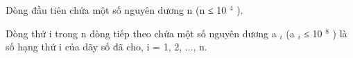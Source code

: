 Dòng đầu tiên chứa một số nguyên dương n (n ≤ 10 $^ 4 $ ).

Dòng thứ i trong n dòng tiếp theo chứa một số nguyên dương a $_ i $ (a $_ i $ ≤ 10 $^ 8 $ ) là số hạng thứ i của dãy số đã cho, i = 1, 2, ..., n.

\